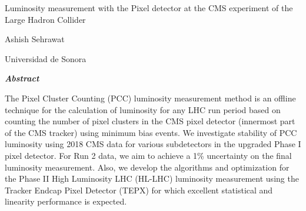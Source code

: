 \documentclass[final,11p]{CSP}
\def\Student{Ashish Sehrawat}
\def\Universidad{Universidad de Sonora}
\def\ProjectTitle{Luminosity measurement with the Pixel detector at the CMS experiment of the Large Hadron Collider }
\begin{document}
\begin{adjustwidth}{1cm}{1cm}

  \begin{center}
    {\Large \ProjectTitle \par}
    \vspace{0.5cm}

    {\Student \par}
    {\Universidad \par}  
    \vspace{1cm}
    
    {\itshape\textbf{Abstract}\par}
     \vspace{0.7 cm}
        
    \end{center}  

 
  \onehalfspacing The Pixel Cluster Counting (PCC) luminosity measurement method is an offline technique for the calculation of luminosity for any LHC run period based on counting the number of pixel clusters in the CMS pixel detector (innermost part of the CMS tracker) using minimum bias events. We investigate stability of PCC luminosity using 2018 CMS data for various subdetectors in the upgraded Phase I pixel detector. For Run 2 data, we aim to achieve a 1\% uncertainty on the final luminosity measurement. Also, we develop the algorithms and optimization for the Phase II High Luminosity LHC (HL-LHC) luminosity measurement using the Tracker Endcap Pixel Detector (TEPX) for which excellent statistical and linearity performance is expected.


    
\end{adjustwidth}

\hspace{2pt}
\vspace{1 cm}

\clearpage
\shipout\null


\newpage
\tableofcontents

\clearpage
\newpage





















\cleardoublepage
\onehalfspacing


\end{document}

